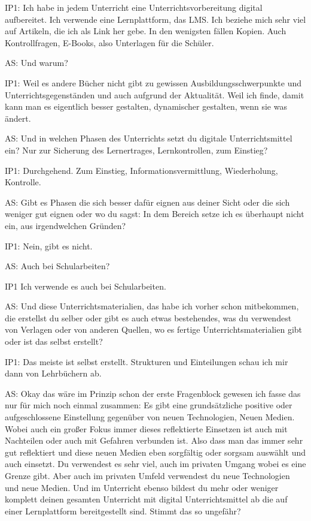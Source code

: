 \documentclass[fontsize=11pt,paper=a4]{scrbook}
\begin{document}
{\begin{itemize*}
\item[IP1:] Ich habe in jedem Unterricht eine Unterrichtsvorbereitung digital aufbereitet. Ich verwende eine Lernplattform, das LMS. Ich beziehe mich sehr viel auf Artikeln, die ich als Link her gebe. In den wenigsten fällen Kopien. Auch Kontrollfragen, E-Books, also Unterlagen für die Schüler.
\item[AS:] Und warum?
\item[IP1:] Weil es andere Bücher nicht gibt zu gewissen Ausbildungsschwerpunkte und Unterrichtsgegenständen und auch aufgrund der Aktualität. Weil ich finde, damit kann man es eigentlich besser gestalten, dynamischer gestalten, wenn sie was ändert.
\item[AS:]Und in welchen Phasen des Unterrichts setzt du digitale Unterrichtsmittel ein? Nur zur Sicherung des Lernertrages, Lernkontrollen, zum Einstieg?
\item[IP1:] Durchgehend. Zum Einstieg, Informationsvermittlung, Wiederholung, Kontrolle.
\item[AS:] Gibt es Phasen die sich besser dafür eignen aus deiner Sicht oder die sich weniger gut eignen oder wo du sagst: In dem Bereich setze ich es überhaupt nicht ein, aus irgendwelchen Gründen?
\item[IP1:] Nein, gibt es nicht.
\item[AS:]Auch bei Schularbeiten?
\item[IP1] Ich verwende es auch bei Schularbeiten.
\item[AS:] Und diese Unterrichtsmaterialien, das habe ich vorher schon mitbekommen, die erstellst du selber oder gibt es auch etwas bestehendes, was du verwendest von Verlagen oder von anderen Quellen, wo es fertige Unterrichtsmaterialien gibt oder ist das selbst erstellt?
\item[IP1:] Das meiste ist selbst erstellt. Strukturen und Einteilungen schau ich mir dann von Lehrbüchern ab.
\item[AS:] Okay das wäre im Prinzip schon der erste Fragenblock gewesen ich fasse das nur für mich noch einmal zusammen:
Es gibt eine grundsätzliche positive oder aufgeschlossene Einstellung gegenüber von neuen Technologien, Neuen Medien. Wobei auch ein großer Fokus immer dieses reflektierte Einsetzen ist auch mit Nachteilen oder auch mit Gefahren verbunden ist. Also dass man das immer sehr gut reflektiert und diese neuen Medien eben sorgfältig oder sorgsam auswählt und auch einsetzt. Du verwendest es sehr viel, auch im privaten Umgang wobei es eine Grenze gibt. Aber auch im privaten Umfeld verwendest du neue Technologien und neue Medien. Und im Unterricht ebenso bildest du mehr oder weniger komplett deinen gesamten Unterricht mit digital Unterrichtsmittel ab die auf einer Lernplattform bereitgestellt sind. Stimmt das so ungefähr?

\end{itemize*}}
\end{document}
